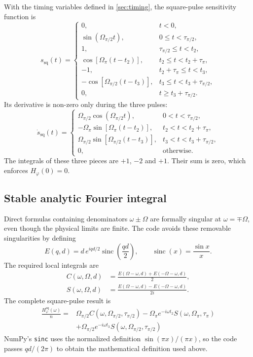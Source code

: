 \documentclass[11pt,a4paper]{article}
\newcommand{\Hphi}{H_{\varphi}}
\newcommand{\tauhalf}{\tau_{\pi/2}}
\newcommand{\taupi}{\tau_{\pi}}
\newcommand{\Omegahalf}{\Omega_{\pi/2}}
\newcommand{\Omegapi}{\Omega_{\pi}}
\begin{document}
With the timing variables defined in \cref{sec:timing}, the square-pulse sensitivity function is
\begin{equation}
s_{\mathrm{sq}}(t)=
\begin{cases}
0, & t<0,\\
\sin(\Omegahalf t), & 0\leq t<\tauhalf,\\
1, & \tauhalf\leq t<t_2,\\
\cos[\Omegapi(t-t_2)], & t_2\leq t<t_2+\taupi,\\
-1, & t_2+\taupi\leq t<t_3,\\
-\cos[\Omegahalf(t-t_3)], & t_3\leq t<t_3+\tauhalf,\\
0, & t\geq t_3+\tauhalf.
\end{cases}
\label{eq:sSquare}
\end{equation}
Its derivative is non-zero only during the three pulses:
\begin{equation}
\dot{s}_{\mathrm{sq}}(t)=
\begin{cases}
\Omegahalf\cos(\Omegahalf t), & 0<t<\tauhalf,\\
-\Omegapi\sin[\Omegapi(t-t_2)], & t_2<t<t_2+\taupi,\\
\Omegahalf\sin[\Omegahalf(t-t_3)], & t_3<t<t_3+\tauhalf,\\
0, & \text{otherwise}.
\end{cases}
\label{eq:dsSquare}
\end{equation}
The integrals of these three pieces are $+1$, $-2$ and $+1$. Their sum is zero, which enforces $\Hphi(0)=0$.

\subsection{Stable analytic Fourier integral}

Direct formulas containing denominators $\omega\pm\Omega$ are formally singular at $\omega=\mp\Omega$, even though the physical limits are finite. The code avoids these removable singularities by defining
\begin{equation}
E(q,d)=d\,e^{iqd/2}\operatorname{sinc}\!\left(\frac{qd}{2}\right),
\qquad \operatorname{sinc}(x)=\frac{\sin x}{x}.
\end{equation}
The required local integrals are
\begin{align}
C(\omega,\Omega,d)&=\frac{E(\Omega-\omega,d)+E(-\Omega-\omega,d)}{2},\\
S(\omega,\Omega,d)&=\frac{E(\Omega-\omega,d)-E(-\Omega-\omega,d)}{2i}.
\end{align}
The complete square-pulse result is
\begin{equation}
\boxed{\begin{aligned}
\frac{\Hphi^{\mathrm{sq}}(\omega)}{n}
={}&\Omegahalf C(\omega,\Omegahalf,\tauhalf)
-\Omegapi e^{-i\omega t_2}S(\omega,\Omegapi,\taupi)\\
&+\Omegahalf e^{-i\omega t_3}S(\omega,\Omegahalf,\tauhalf)
\end{aligned}}
\label{eq:Hsquare}
\end{equation}
NumPy's \texttt{sinc} uses the normalized definition $\sin(\pi x)/(\pi x)$, so the code passes $qd/(2\pi)$ to obtain the mathematical definition used above.
\end{document}
